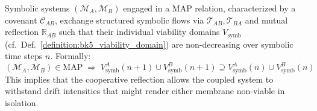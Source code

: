 \begin{axiom}
\label{axiom:bk5_mutual_metabolit_viability}
Symbolic systems $(\mathscr{M}_A, \mathscr{M}_B)$ engaged in a MAP relation, characterized by a covenant $\mathcal{C}_{AB}$, exchange structured symbolic flows via $\mathcal{T}_{AB}, \mathcal{T}_{BA}$ and mutual reflection $\mathbb{R}_{AB}$ such that their individual viability domains $V_{\text{symb}}$ (cf.~Def.~\ref{definition:bk5_viability_domain}) are non-decreasing over symbolic time steps $n$. Formally:
\begin{equation}
(\mathscr{M}_A, \mathscr{M}_B) \in \text{MAP} \;\Longrightarrow\; V_{\text{symb}}^A(n+1) \cup V_{\text{symb}}^B(n+1) \supseteq V_{\text{symb}}^A(n) \cup V_{\text{symb}}^B(n)
\end{equation}
This implies that the cooperative reflection allows the coupled system to withstand drift intensities that might render either membrane non-viable in isolation.
\end{axiom}

